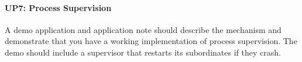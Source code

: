 \paragraph*{UP7: Process Supervision}

A demo application and application note should describe the mechanism and demonstrate that you have a working implementation of process supervision. The demo should include a supervisor that restarts its subordinates if they crash.
